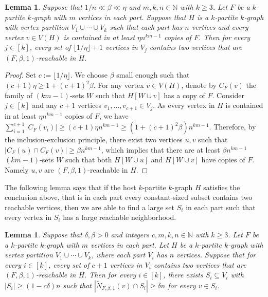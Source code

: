 \documentclass[11pt,a4paper]{article}
\newtheorem{lemma}[thm]{Lemma}
\theoremstyle{definition}
\begin{document}
\begin{lemma}\label{reachable}
Suppose that $1/n \ll \beta \ll \eta$ and $m,k,n\in \mathbb{N}$ with $k\geq 3$. Let $F$ be a $k$-partite $k$-graph with $m$ vertices in each part.
 Suppose that $H$ is a $k$-partite $k$-graph with vertex partition $V_1\cup \cdots \cup V_k$ such that each part has $n$ vertices and every vertex $v\in V(H)$ is contained in at least $\eta n^{km-1}$ copies of $F$. Then for every $j\in [k]$, every set of $\lfloor 1/\eta \rfloor+1$ vertices in $V_j$ contains two vertices that are $(F,\beta ,1)$-reachable in $H$.
\end{lemma}

\begin{proof}
    Set $c:=\lfloor 1/\eta \rfloor$. We choose $\beta $ small enough such that $(c+1)\eta \geq 1+(c+1)^2\beta $. For any vertex $v\in V(H)$, denote by $C_F(v)$ the family of $(km-1)$-sets $W$ such that $H[W\cup v]$ has a copy of $F$. Consider $j\in [k]$ and any $c+1$ vertices $v_1, \dots ,v_{c+1}\in V_j$. As every vertex in $H$ is contained in at least $\eta n^{km-1}$ copies of $F$, we have $\sum_{i=1} ^{c+1}|C_F(v_i)|\geq (c+1)\eta n^{km-1}\geq (1+(c+1)^2\beta )n^{km-1}$. Therefore, by the inclusion-exclusion principle, there exist two vertices $u, v$ such that $|C_F(u)\cap C_F(v)|\geq \beta n^{km-1}$, which implies that there are at least $\beta n^{km-1}$ $(km-1)$-sets $W$ such that both $H[W\cup u]$ and $H[W\cup v]$ have copies of $F$. Namely $u,v$ are $(F,\beta ,1)$-reachable in $H$.
\end{proof}

The following lemma says that if the host $k$-partite $k$-graph $H$ satisfies the conclusion above, that is in each part every constant-sized subset contains two reachable vertices, then we are able to find a large set $S_i$ in each part such that every vertex in $S_i$ has a large reachable neighborhood.

\begin{lemma}\label{S-closed}
Suppose that $\delta ,\beta >0$ and integers $c,m,k,n\in \mathbb{N}$ with $k\geq 3$. Let $F$ be a $k$-partite $k$-graph with $m$ vertices in each part. Let $H$ be a $k$-partite $k$-graph with vertex partition $V_1\cup \cdots \cup V_k$, where each part $V_i$ has $n$ vertices. Suppose that for every $i\in [k]$, every set of $c+1$ vertices in $V_i$ contains two vertices that are $(F,\beta ,1)$-reachable in $H$. Then for every $i\in [k]$, there exists $S_i\subseteq V_i$ with $|S_i|\geq (1-c\delta )n$ such that $|\tilde{N}_{F, \beta , 1}(v)\cap S_i|\geq \delta n$ for every $v\in S_i$.
\end{lemma}
\end{document}

